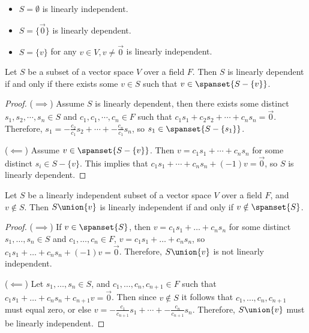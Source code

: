\documentclass[12pt]{article}
\begin{document}
\begin{exmp}\proofbreak
    \begin{itemize}
        \item $S = \emptyset$ is linearly independent.
        \item $S = \{\vec{0}\}$ is linearly dependent.
        \item $S = \{v\}$ for any $v \in V, v \neq \vec{0}$ is linearly independent.
    \end{itemize}
\end{exmp}

\begin{prop}\label{linear-dependence-implies-extra-vector}
    Let $S$ be a subset of a vector space $V$ over a field $F$. Then $S$ is linearly dependent if and only if there exists some $v \in S$ such that $v \in \spanset{S - \{v\}}$.
\end{prop}

\begin{proof}\proofbreak
    ($\implies$) Assume $S$ is linearly dependent, then there exists some distinct $s_1, s_2, \cdots, s_n \in S$ and $c_1, c_1, \cdots, c_n \in F$ such that $c_1s_1 + c_2s_2 + \cdots + c_ns_n = \vec{0}$. Therefore, $s_1 = -\frac{c_2}{c_1}s_2 + \cdots + -\frac{c_n}{c_1}s_n$, so $s_1 \in \spanset{S - \{s_1\}}$.

    ($\impliedby$) Assume $v \in \spanset{S - \{v\}}$. Then $v = c_1s_1 + \cdots + c_ns_n$ for some distinct $s_i \in S - \{v\}$. This implies that $c_1s_1 + \cdots + c_ns_n + (-1)v = \vec{0}$, so $S$ is linearly dependent.
\end{proof}

\begin{prop}\label{linear-independence-with-extra-vector}
    Let $S$ be a linearly independent subset of a vector space $V$ over a field $F$, and $v \notin S$. Then $S \union \{v\}$ is linearly independent if and only if $v \notin \spanset{S}$.
\end{prop}

\begin{proof}\proofbreak
    ($\implies$) If $v \in \spanset{S}$, then $v = c_1s_1 + \ldots + c_ns_n$ for some distinct $s_1, \ldots, s_n \in S$ and $c_1, \ldots, c_n \in F$, $v = c_1s_1 + \ldots + c_ns_n$, so $c_1s_1 + \ldots + c_ns_n + (-1)v = \vec{0}$. Therefore, $S \union \{v\}$ is not linearly independent.

    ($\impliedby$) Let $s_1, \ldots, s_n \in S$, and $c_1, \ldots, c_n, c_{n+1} \in F$ such that $c_1s_1 + \ldots + c_ns_n + c_{n+1}v = \vec{0}$. Then since $v \notin S$ it follows that $c_1, \ldots, c_n, c_{n+1}$ must equal zero, or else $v = -\frac{c_1}{c_{n+1}}s_1 + \cdots + -\frac{c_n}{c_{n+1}}s_n$. Therefore, $S \union \{v\}$ must be linearly independent.
\end{proof}
\end{document}
